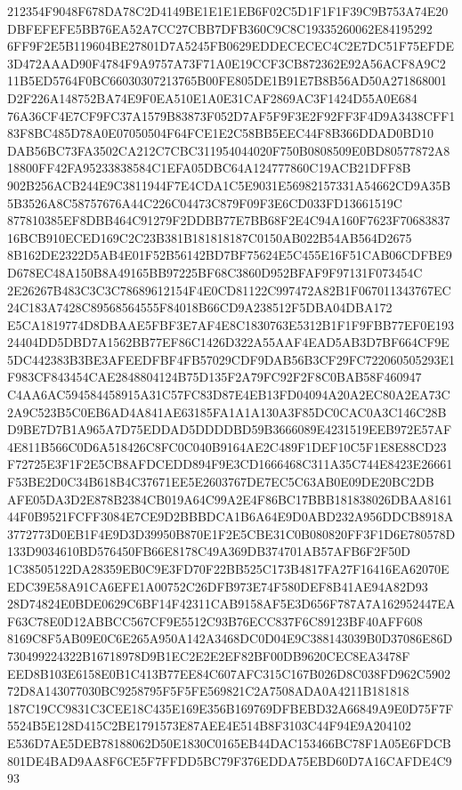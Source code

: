 \documentclass[UTF8,fontset=fandol,zihao=-4,a4paper]{ctexart}
\begin{document}
{{212354F9048F678DA78C2D4149BE1E1E1EB6F02C5D1F1F1F39C9B753A74E20DBFEFEFE5BB76EA52A7CC27CBB7DFB360C9C8C19335260062E84195292
6FF9F2E5B119604BE27801D7A5245FB0629EDDECECEC4C2E7DC51F75EFDE3D472AAAD90F4784F9A9757A73F71A0E19CCF3CB872362E92A56ACF8A9C2
11B5ED5764F0BC66030307213765B00FE805DE1B91E7B8B56AD50A271868001D2F226A148752BA74E9F0EA510E1A0E31CAF2869AC3F1424D55A0E684
76A36CF4E7CF9FC37A1579B83873F052D7AF5F9F3E2F92FF3F4D9A3438CFF183F8BC485D78A0E07050504F64FCE1E2C58BB5EEC44F8B366DDAD0BD10
DAB56BC73FA3502CA212C7CBC311954044020F750B0808509E0BD80577872A818800FF42FA95233838584C1EFA05DBC64A124777860C19ACB21DFF8B
902B256ACB244E9C3811944F7E4CDA1C5E9031E56982157331A54662CD9A35B5B3526A8C58757676A44C226C04473C879F09F3E6CD033FD13661519C
877810385EF8DBB464C91279F2DDBB77E7BB68F2E4C94A160F7623F7068383716BCB910ECED169C2C23B381B181818187C0150AB022B54AB564D2675
8B162DE2322D5AB4E01F52B56142BD7BF75624E5C455E16F51CAB06CDFBE9D678EC48A150B8A49165BB97225BF68C3860D952BFAF9F97131F073454C
2E26267B483C3C3C78689612154F4E0CD81122C997472A82B1F067011343767EC24C183A7428C89568564555F84018B66CD9A238512F5DBA04DBA172
E5CA1819774D8DBAAE5FBF3E7AF4E8C1830763E5312B1F1F9FBB77EF0E19324404DD5DBD7A1562BB77EF86C1426D322A55AAF4EAD5AB3D7BF664CF9E
5DC442383B3BE3AFEEDFBF4FB57029CDF9DAB56B3CF29FC722060505293E1F983CF843454CAE2848804124B75D135F2A79FC92F2F8C0BAB58F460947
C4AA6AC594584458915A31C57FC83D87E4EB13FD04094A20A2EC80A2EA73C2A9C523B5C0EB6AD4A841AE63185FA1A1A130A3F85DC0CAC0A3C146C28B
D9BE7D7B1A965A7D75EDDAD5DDDDBD59B3666089E4231519EEB972E57AF4E811B566C0D6A518426C8FC0C040B9164AE2C489F1DEF10C5F1E8E88CD23
F72725E3F1F2E5CB8AFDCEDD894F9E3CD1666468C311A35C744E8423E26661F53BE2D0C34B618B4C37671EE5E2603767DE7EC5C63AB0E09DE20BC2DB
AFE05DA3D2E878B2384CB019A64C99A2E4F86BC17BBB181838026DBAA816144F0B9521FCFF3084E7CE9D2BBBDCA1B6A64E9D0ABD232A956DDCB8918A
3772773D0EB1F4E9D3D39950B870E1F2E5CBE31C0B080820FF3F1D6E780578D133D9034610BD576450FB66E8178C49A369DB374701AB57AFB6F2F50D
1C38505122DA28359EB0C9E3FD70F22BB525C173B4817FA27F16416EA62070EEDC39E58A91CA6EFE1A00752C26DFB973E74F580DEF8B41AE94A82D93
28D74824E0BDE0629C6BF14F42311CAB9158AF5E3D656F787A7A162952447EAF63C78E0D12ABBCC567CF9E5512C93B76ECC837F6C89123BF40AFF608
8169C8F5AB09E0C6E265A950A142A3468DC0D04E9C388143039B0D37086E86D730499224322B16718978D9B1EC2E2E2EF82BF00DB9620CEC8EA3478F
EED8B103E6158E0B1C413B77EE84C607AFC315C167B026D8C038FD962C590272D8A143077030BC9258795F5F5FE569821C2A7508ADA0A4211B181818
187C19CC9831C3CEE18C435E169E356B169769DFBEBD32A66849A9E0D75F7F5524B5E128D415C2BE1791573E87AEE4E514B8F3103C44F94E9A204102
E536D7AE5DEB78188062D50E1830C0165EB44DAC153466BC78F1A05E6FDCB801DE4BAD9AA8F6CE5F7FFDD5BC79F376EDDA75EBD60D7A16CAFDE4C993
}}
\end{document}
